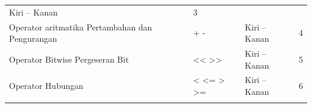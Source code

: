 \begin{longtable}[]{@{}llll@{}}
\begin{minipage}[t]{0.14\columnwidth}\raggedright\strut
Kiri -- Kanan
\strut\end{minipage} &
\begin{minipage}[t]{0.05\columnwidth}\raggedright\strut
3
\strut\end{minipage}\tabularnewline
\begin{minipage}[t]{0.52\columnwidth}\raggedright\strut
Operator aritmatika Pertambahan dan Pengurangan
\strut\end{minipage} &
\begin{minipage}[t]{0.17\columnwidth}\raggedright\strut
+ -
\strut\end{minipage} &
\begin{minipage}[t]{0.14\columnwidth}\raggedright\strut
Kiri -- Kanan
\strut\end{minipage} &
\begin{minipage}[t]{0.05\columnwidth}\raggedright\strut
4
\strut\end{minipage}\tabularnewline
\begin{minipage}[t]{0.52\columnwidth}\raggedright\strut
Operator Bitwise Pergeseran Bit
\strut\end{minipage} &
\begin{minipage}[t]{0.17\columnwidth}\raggedright\strut
\textless{}\textless{} \textgreater{}\textgreater{}
\strut\end{minipage} &
\begin{minipage}[t]{0.14\columnwidth}\raggedright\strut
Kiri -- Kanan
\strut\end{minipage} &
\begin{minipage}[t]{0.05\columnwidth}\raggedright\strut
5
\strut\end{minipage}\tabularnewline
\begin{minipage}[t]{0.52\columnwidth}\raggedright\strut
Operator Hubungan
\strut\end{minipage} &
\begin{minipage}[t]{0.17\columnwidth}\raggedright\strut
\textless{} \textless{}= \textgreater{} \textgreater{}=
\strut\end{minipage} &
\begin{minipage}[t]{0.14\columnwidth}\raggedright\strut
Kiri -- Kanan
\strut\end{minipage} &
\begin{minipage}[t]{0.05\columnwidth}\raggedright\strut
6
\strut\end{minipage}\tabularnewline
\begin{minipage}[t]{0.52\columnwidth}\raggedright\strut

\end{minipage}
\end{longtable}

